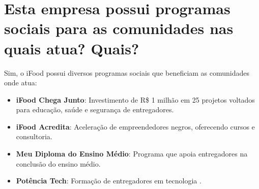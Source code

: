 \section{Esta empresa possui programas sociais para as comunidades nas quais atua? Quais?}

Sim, o iFood possui diversos programas sociais que beneficiam as comunidades onde atua:

\begin{itemize}
    \item \textbf{iFood Chega Junto}: Investimento de R\$ 1 milhão em 25 projetos voltados para educação, saúde e segurança de entregadores.
    \item \textbf{iFood Acredita}: Aceleração de empreendedores negros, oferecendo cursos e consultoria.
    \item \textbf{Meu Diploma do Ensino Médio}: Programa que apoia entregadores na conclusão do ensino médio.
    \item \textbf{Potência Tech}: Formação de entregadores em tecnologia \cite{ifoodsocial2023}.
\end{itemize}